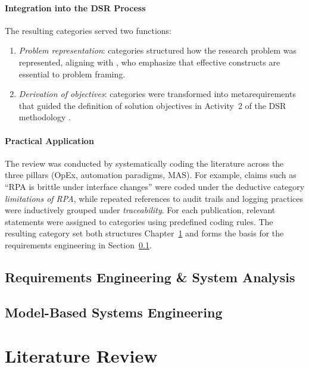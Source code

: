 \paragraph*{Integration into the DSR Process}
The resulting categories served two functions:
\begin{enumerate}
    \item \textit{Problem representation}: categories structured how the research problem was represented, aligning with \textcite{hevnerDesignScienceInformation2004}, who emphasize that effective constructs are essential to problem framing.
    \item \textit{Derivation of objectives}: categories were transformed into metarequirements that guided the definition of solution objectives in Activity~2 of the DSR methodology \parencite{peffersDesignScienceMethodology2007}.
\end{enumerate}

\paragraph*{Practical Application}
The review was conducted by systematically coding the literature across the three pillars (OpEx, automation paradigms, MAS). 
For example, claims such as ``RPA is brittle under interface changes'' were coded under the deductive category \emph{limitations of RPA}, 
while repeated references to audit trails and logging practices were inductively grouped under \emph{traceability}. 
For each publication, relevant statements were assigned to categories using predefined coding rules. 
The resulting category set both structures Chapter~\ref{sec:lit-rev} and forms the basis for the requirements engineering in Section~\ref{subsec:re-sa}.

\subsection{Requirements Engineering \& System Analysis}\label{subsec:re-sa}

\subsection{Model-Based Systems Engineering}\label{subsec:mbse}

\section{Literature Review}\label{sec:lit-rev}

